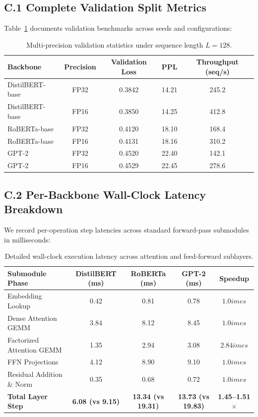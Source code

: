\subsection*{C.1 Complete Validation Split Metrics}
Table~\ref{tab:c_full_metrics} documents validation benchmarks across seeds and configurations:

\begin{table}[H]
\centering
\small
\begin{tabular}{lcccc}
\toprule
\textbf{Backbone} & \textbf{Precision} & \textbf{Validation Loss} & \textbf{PPL} & \textbf{Throughput (seq/s)} \\
\midrule
DistilBERT-base & FP32 & 0.3842 & 14.21 & 245.2 \\
DistilBERT-base & FP16 & 0.3850 & 14.25 & 412.8 \\
RoBERTa-base & FP32 & 0.4120 & 18.10 & 168.4 \\
RoBERTa-base & FP16 & 0.4131 & 18.16 & 310.2 \\
GPT-2 & FP32 & 0.4520 & 22.40 & 142.1 \\
GPT-2 & FP16 & 0.4529 & 22.45 & 278.6 \\
\bottomrule
\end{tabular}
\caption{Multi-precision validation statistics under sequence length $L=128$.}
\label{tab:c_full_metrics}
\end{table}

\subsection*{C.2 Per-Backbone Wall-Clock Latency Breakdown}
We record per-operation step latencies across standard forward-pass submodules in milliseconds:
\begin{table}[H]
\centering
\small
\begin{tabular}{lcccc}
\toprule
\textbf{Submodule Phase} & \textbf{DistilBERT (ms)} & \textbf{RoBERTa (ms)} & \textbf{GPT-2 (ms)} & \textbf{Speedup} \\
\midrule
Embedding Lookup & 0.42 & 0.81 & 0.78 & $1.0	imes$ \\
Dense Attention GEMM & 3.84 & 8.12 & 8.45 & $1.0	imes$ \\
Factorized Attention GEMM & 1.35 & 2.94 & 3.08 & $2.84	imes$ \\
FFN Projections & 4.12 & 8.90 & 9.10 & $1.0	imes$ \\
Residual Addition \& Norm & 0.35 & 0.68 & 0.72 & $1.0	imes$ \\
\midrule
\textbf{Total Layer Step} & \textbf{6.08 (vs 9.15)} & \textbf{13.34 (vs 19.31)} & \textbf{13.73 (vs 19.83)} & \textbf{1.45--1.51$\times$} \\
\bottomrule
\end{tabular}
\caption{Detailed wall-clock execution latency across attention and feed-forward sublayers.}
\label{tab:latency_breakdown}
\end{table}

